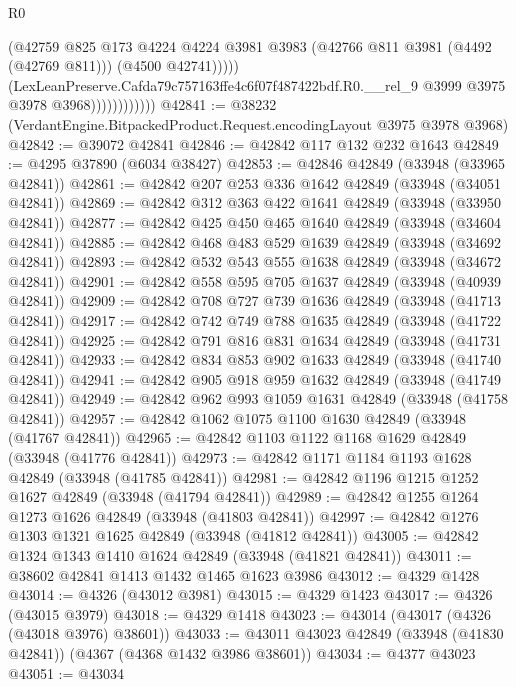 \begin{lexlean}{R0}
\begin{coremodule}
                                (@42759
                                  @825
                                  @173
                                  @4224
                                  @4224
                                  @3981
                                  @3983
                                  (@42766 @811 @3981 (@4492 (@42769 @811)))
                                  (@4500 @42741)))))
                          (LexLeanPreserve.Cafda79c757163ffe4c6f07f487422bdf.R0.__rel_9
                            @3999
                            @3975
                            @3978
                            @3968))))))))))))
@42841 := @38232 (VerdantEngine.BitpackedProduct.Request.encodingLayout @3975 @3978 @3968)
@42842 := @39072 @42841
@42846 := @42842 @117 @132 @232 @1643
@42849 := @4295 @37890 (@6034 @38427)
@42853 := @42846 @42849 (@33948 (@33965 @42841))
@42861 := @42842 @207 @253 @336 @1642 @42849 (@33948 (@34051 @42841))
@42869 := @42842 @312 @363 @422 @1641 @42849 (@33948 (@33950 @42841))
@42877 := @42842 @425 @450 @465 @1640 @42849 (@33948 (@34604 @42841))
@42885 := @42842 @468 @483 @529 @1639 @42849 (@33948 (@34692 @42841))
@42893 := @42842 @532 @543 @555 @1638 @42849 (@33948 (@34672 @42841))
@42901 := @42842 @558 @595 @705 @1637 @42849 (@33948 (@40939 @42841))
@42909 := @42842 @708 @727 @739 @1636 @42849 (@33948 (@41713 @42841))
@42917 := @42842 @742 @749 @788 @1635 @42849 (@33948 (@41722 @42841))
@42925 := @42842 @791 @816 @831 @1634 @42849 (@33948 (@41731 @42841))
@42933 := @42842 @834 @853 @902 @1633 @42849 (@33948 (@41740 @42841))
@42941 := @42842 @905 @918 @959 @1632 @42849 (@33948 (@41749 @42841))
@42949 := @42842 @962 @993 @1059 @1631 @42849 (@33948 (@41758 @42841))
@42957 := @42842 @1062 @1075 @1100 @1630 @42849 (@33948 (@41767 @42841))
@42965 := @42842 @1103 @1122 @1168 @1629 @42849 (@33948 (@41776 @42841))
@42973 := @42842 @1171 @1184 @1193 @1628 @42849 (@33948 (@41785 @42841))
@42981 := @42842 @1196 @1215 @1252 @1627 @42849 (@33948 (@41794 @42841))
@42989 := @42842 @1255 @1264 @1273 @1626 @42849 (@33948 (@41803 @42841))
@42997 := @42842 @1276 @1303 @1321 @1625 @42849 (@33948 (@41812 @42841))
@43005 := @42842 @1324 @1343 @1410 @1624 @42849 (@33948 (@41821 @42841))
@43011 := @38602 @42841 @1413 @1432 @1465 @1623 @3986
@43012 := @4329 @1428
@43014 := @4326 (@43012 @3981)
@43015 := @4329 @1423
@43017 := @4326 (@43015 @3979)
@43018 := @4329 @1418
@43023 := @43014 (@43017 (@4326 (@43018 @3976) @38601))
@43033 := @43011 @43023 @42849 (@33948 (@41830 @42841)) (@4367 (@4368 @1432 @3986 @38601))
@43034 := @4377 @43023
@43051 := @43034

\end{coremodule}
\end{lexlean}
